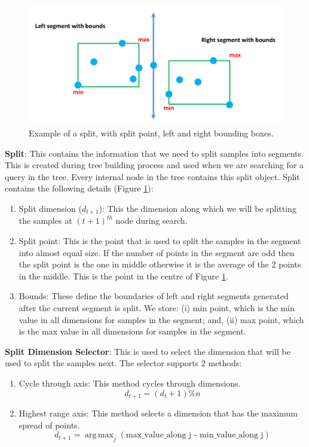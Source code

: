 \documentclass[11pt]{amsart}
\begin{document}
\begin{list}{}{\leftmargin= 1.4cm}
\begin{figure}[t!]
\centering
\includegraphics[width=\linewidth]{images/bounding_box}
\caption{Example of a split, with split point, left and right bounding boxes.}
\label{fig:bounding_box}
\end{figure}

\item \textbf{Split}: This contains the information that we need to split samples into segments. This is created during tree building process and used when we are searching for a query in the tree. Every internal node in the tree contains this split object. Split contains the following details (Figure \ref{fig:bounding_box}):
\vspace{1.5 mm}
\begin{enumerate} \setlength\itemsep{0.5em}
\item Split dimension ($d_{t+1}$): This the dimension along which we will be splitting the samples at ${(t+1)}^{th}$ node during search.
\item Split point: This is the point that is used to split the samples in the segment into almost equal size. If the number of points in the segment are odd then the split point is the one in middle otherwise it is the average of the 2 points in the middle. This is the point in the centre of Figure  \ref{fig:bounding_box}.
\item Bounds:  These define the boundaries of left and right segments generated after the current segment is split. We store: (i) min point, which is the min value in all dimensions for samples in the segment; and, (ii) max point, which is the max value in all dimensions for samples in the segment.
\end{enumerate}
\item \textbf{Split Dimension Selector}: This is used to select the dimension that will be used to split the samples next. The selector supports 2 methods:
\vspace{1.5 mm}
\begin{enumerate}\setlength\itemsep{0.5em}
\item Cycle through axis: This method cycles through dimensions. 
\[ d_{t+1} = (d_{t} + 1)  \% n \]
\item Highest range axis: This method selects a dimension that has the maximum spread of points.
\[ d_{t+1} = \operatorname{arg\,max}_j  (\text{max\_value\_along j - min\_value\_along j})\] 
\end{enumerate}


\end{list}
\end{document}
